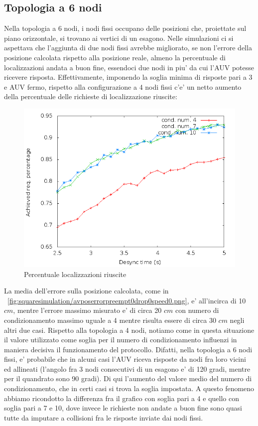 \subsection{Topologia a 6 nodi}
Nella topologia a 6 nodi, i nodi fissi occupano delle posizioni che, proiettate sul piano orizzontale, si trovano ai vertici di un esagono.
Nelle simulazioni ci si aspettava che l'aggiunta di due nodi fissi avrebbe migliorato, se non l'errore della posizione calcolata rispetto alla posizione reale, almeno la percentuale di localizzazioni andata a buon fine, essendoci due nodi in piu' da cui l'AUV potesse ricevere risposta. Effettivamente, imponendo la soglia minima di risposte pari a 3 e AUV fermo, rispetto alla configurazione a 4 nodi fissi c'e' un netto aumento della percentuale delle richieste di localizzazione riuscite:
\begin{figure}[H]
    \centering
    \includegraphics[scale=0.5]{hexagonsimulation/achievedlocreq3preempt0drop0speed0.png}
    \caption{Percentuale localizzazioni riuscite}
    \label{fig:hexagonsimulation/achievedlocreq3preempt0drop0speed0}
\end{figure}
La media dell'errore sulla posizione calcolata, come in ~\ref{fig:squaresimulation/avposerrorpreempt0drop0speed0.png}, e' all'incirca di 10 $cm$, mentre l'errore massimo misurato e' di circa 20 $cm$ con numero di condizionamento massimo uguale a 4 mentre risulta essere di circa 30 $cm$ negli altri due casi.
Rispetto alla topologia a 4 nodi, notiamo come in questa situazione il valore utilizzato come soglia per il numero di condizionamento influenzi in maniera decisiva il funzionamento del protocollo. Difatti, nella topologia a 6 nodi fissi, e' probabile che in alcuni casi l'AUV riceva risposte da nodi fra loro vicini ed allineati (l'angolo fra 3 nodi consecutivi di un esagono e' di 120 gradi, mentre per il quandrato sono 90 gradi). Di qui l'aumento del valore medio del numero di condizionamento, che in certi casi si trova la soglia impostata. A questo fenomeno abbiamo ricondotto la differenza fra il grafico con soglia pari a 4 e quello con soglia pari a 7 e 10, dove invece le richieste non andate a buon fine sono quasi tutte da imputare a collisioni fra le risposte inviate dai nodi fissi.
